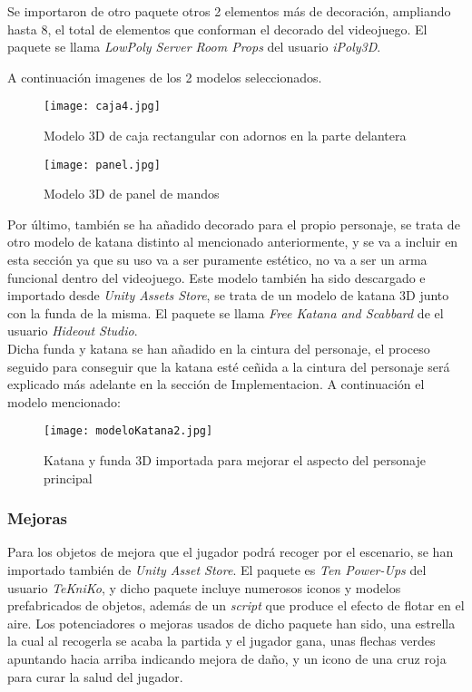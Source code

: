 Se importaron de otro paquete otros 2 elementos más de decoración, ampliando hasta 8, el total de elementos que conforman el decorado del videojuego. El paquete se llama \textit{LowPoly Server Room Props} del usuario \textit{iPoly3D}.

A continuación imagenes de los 2 modelos seleccionados.

\begin{figure}[H]
    \centering
    \texttt{[image: caja4.jpg]}
    \caption{Modelo 3D de caja rectangular con adornos en la parte delantera}
\end{figure}

\begin{figure}[H]
    \centering
    \texttt{[image: panel.jpg]}
    \caption{Modelo 3D de panel de mandos}
\end{figure}

Por último, también se ha añadido decorado para el propio personaje, se trata de otro modelo de katana distinto al mencionado anteriormente, y se va a incluir en esta sección ya que su uso va a ser puramente estético, no va a ser un arma funcional dentro del videojuego. Este modelo también ha sido descargado e importado desde \textit{Unity Assets Store}, se trata de un modelo de katana 3D junto con la funda de la misma. El paquete se llama \textit{Free Katana and Scabbard} de el usuario \textit{Hideout Studio}.\\

Dicha funda y katana se han añadido en la cintura del personaje, el proceso seguido para conseguir que la katana esté ceñida a la cintura del personaje será explicado más adelante en la sección de Implementacion. A continuación el modelo mencionado:

\begin{figure}[H]
    \centering
    \texttt{[image: modeloKatana2.jpg]}
    \caption{Katana y funda 3D importada para mejorar el aspecto del personaje principal}
\end{figure}

\subsubsection{Mejoras}

Para los objetos de mejora que el jugador podrá recoger por el escenario, se han importado también de \textit{Unity Asset Store}. El paquete es \textit{Ten Power-Ups} del usuario \textit{TeKniKo}, y dicho paquete incluye numerosos iconos y modelos prefabricados de objetos, además de un \textit{script} que produce el efecto de flotar en el aire. Los potenciadores o mejoras usados de dicho paquete han sido, una estrella la cual al recogerla se acaba la partida y el jugador gana, unas flechas verdes apuntando hacia arriba indicando mejora de daño, y un icono de una cruz roja para curar la salud del jugador.

